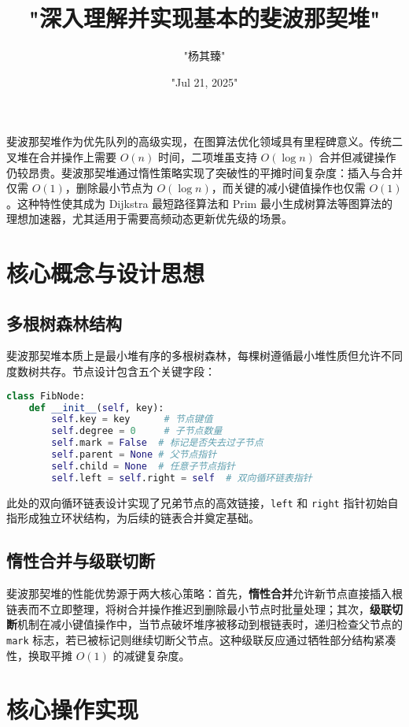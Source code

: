 \title{"深入理解并实现基本的斐波那契堆"}
\author{"杨其臻"}
\date{"Jul 21, 2025"}
\maketitle
斐波那契堆作为优先队列的高级实现，在图算法优化领域具有里程碑意义。传统二叉堆在合并操作上需要 $O(n)$ 时间，二项堆虽支持 $O(\log n)$ 合并但减键操作仍较昂贵。斐波那契堆通过惰性策略实现了突破性的平摊时间复杂度：插入与合并仅需 $O(1)$，删除最小节点为 $O(\log n)$，而关键的减小键值操作也仅需 $O(1)$。这种特性使其成为 Dijkstra 最短路径算法和 Prim 最小生成树算法等图算法的理想加速器，尤其适用于需要高频动态更新优先级的场景。\par
\chapter{核心概念与设计思想}
\section{多根树森林结构}
斐波那契堆本质上是最小堆有序的多根树森林，每棵树遵循最小堆性质但允许不同度数树共存。节点设计包含五个关键字段：\par
\begin{lstlisting}[language=python]
class FibNode:
    def __init__(self, key):
        self.key = key      # 节点键值
        self.degree = 0     # 子节点数量
        self.mark = False  # 标记是否失去过子节点
        self.parent = None # 父节点指针
        self.child = None  # 任意子节点指针
        self.left = self.right = self  # 双向循环链表指针
\end{lstlisting}
此处的双向循环链表设计实现了兄弟节点的高效链接，\texttt{left} 和 \texttt{right} 指针初始自指形成独立环状结构，为后续的链表合并奠定基础。\par
\section{惰性合并与级联切断}
斐波那契堆的性能优势源于两大核心策略：首先，\textbf{惰性合并}允许新节点直接插入根链表而不立即整理，将树合并操作推迟到删除最小节点时批量处理；其次，\textbf{级联切断}机制在减小键值操作中，当节点破坏堆序被移动到根链表时，递归检查父节点的 \texttt{mark} 标志，若已被标记则继续切断父节点。这种级联反应通过牺牲部分结构紧凑性，换取平摊 $O(1)$ 的减键复杂度。\par
\chapter{核心操作实现}
